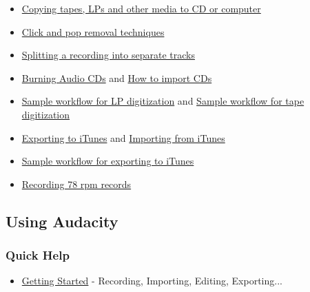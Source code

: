 \begin{multicols}{2}
\begin{itemize}
\end{itemize}

\begin{itemize}
\item 
\hyperref[\foo{man:tutorial:copying:tapes:lps:or:minidiscs:to:cd:}]{Copying tapes, LPs and other media to CD or computer}

\item 
\hyperref[\foo{man:tutorial:click:and:pop:removal:techniques:}]{Click and pop removal techniques}

\item 
\hyperref[\foo{man:splitting:a:recording:into:separate:tracks:}]{Splitting a recording into separate tracks}

\item 
\hyperref[\foo{man:burning:music:files:to:a:cd:}]{Burning Audio CDs}
 and 
\hyperref[\foo{man:tutorial:how:to:import:cds:}]{How to import CDs}

\item 
\hyperref[\foo{man:sample:workflow:for:lp:digitization:}]{Sample workflow for LP digitization}
 and 
\hyperref[\foo{man:sample:workflow:for:tape:digitization:}]{Sample workflow for tape digitization}

\end{itemize}

\begin{itemize}
\item 
\hyperref[\foo{man:tutorial:exporting:to:itunes:}]{Exporting to iTunes}
 and 
\hyperref[\foo{man:tutorial:how:to:import:files:from:itunes:}]{Importing from iTunes}

\item 
\hyperref[\foo{man:sample:workflow:for:exporting:to:itunes:}]{Sample workflow for exporting to iTunes}

\end{itemize}

\begin{itemize}
\item 
\hyperref[\foo{man:recording:78:rpm:records:}]{Recording 78 rpm records}

\end{itemize}

\label{index:bottom:using}
\subsection{Using Audacity}
\label{index:using}
\subsubsection{Quick Help}
\begin{itemize}
\item 
\hyperref[\foo{quick:help:}]{Getting Started}
 - Recording, Importing, Editing, Exporting...


\end{itemize}
\end{multicols}
